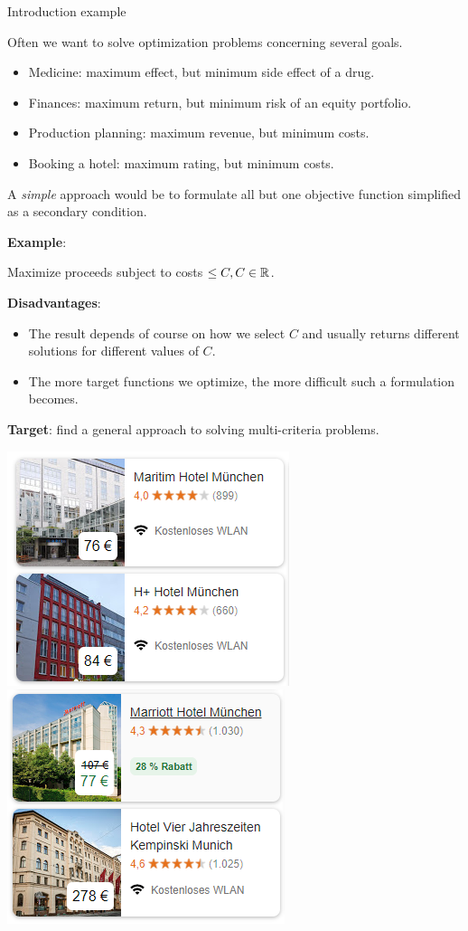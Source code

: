 \begin{frame}[allowframebreaks]{Introduction example}

Often we want to solve optimization problems concerning several goals.

\begin{itemize}
\item Medicine: maximum effect, but minimum side effect of a drug.
\item Finances: maximum return, but minimum risk of an equity portfolio.
\item Production planning: maximum revenue, but minimum costs.
\item Booking a hotel: maximum rating, but minimum costs.
\end{itemize}

A \textit{simple} approach would be to formulate all but one objective function simplified as a secondary condition.

\vspace*{0.2cm}

\framebreak

\textbf{Example}:

Maximize proceeds subject to costs $\le C, C \in \mathbb{R}$.

\vspace*{0.2cm}

 \textbf{Disadvantages}:
\begin{itemize}
 \item The result depends of course on how we select $C$ and usually returns different solutions for different values of $C$.
 \item The more target functions we optimize, the more difficult such a formulation becomes.
\end{itemize}

\vspace*{0.2cm}

\textbf{Target}: find a general approach to solving multi-criteria problems.


\begin{center}
\includegraphics[width = 0.35\linewidth]{images/booking1.png} ~~~ \includegraphics[width = 0.35\linewidth]{images/booking2.png}
\end{center}


\end{frame}
